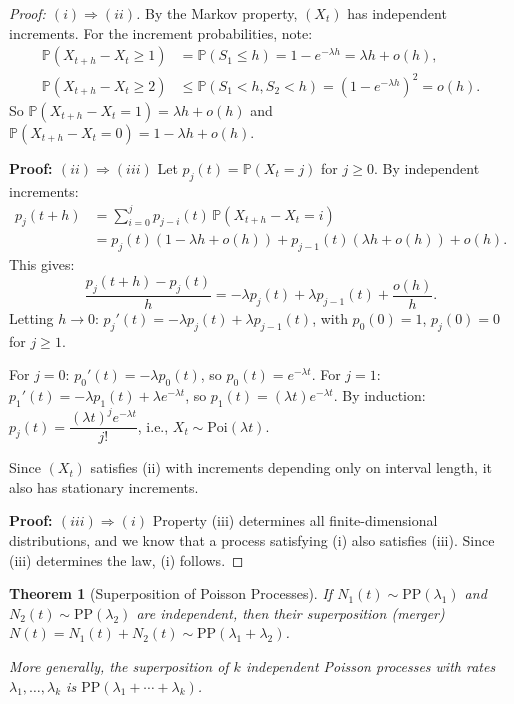\documentclass[12pt, a4paper]{article}
\theoremstyle{definition}
\theoremstyle{plain}
\newtheorem{theorem}{Theorem}[section]
\newcommand{\PP}{\mathbb{P}}
\begin{document}
\begin{proof}[Proof: $(i)\Rightarrow(ii)$]
By the Markov property, $(X_t)$ has independent increments. For the increment probabilities, note:
\begin{align*}
  \PP(X_{t+h}-X_t\ge 1) &= \PP(S_1\le h) = 1-e^{-\lambda h} = \lambda h+o(h),\\
  \PP(X_{t+h}-X_t\ge 2) &\le \PP(S_1<h,S_2<h) = (1-e^{-\lambda h})^2 = o(h).
\end{align*}
So $\PP(X_{t+h}-X_t=1)=\lambda h+o(h)$ and $\PP(X_{t+h}-X_t=0)=1-\lambda h+o(h)$.

\medskip\noindent\textbf{Proof: $(ii)\Rightarrow(iii)$} Let $p_j(t)=\PP(X_t=j)$ for $j\ge 0$. By independent increments:
\begin{align*}
  p_j(t+h) &= \sum_{i=0}^{j} p_{j-i}(t)\,\PP(X_{t+h}-X_t=i)\\
  &= p_j(t)(1-\lambda h+o(h)) + p_{j-1}(t)(\lambda h+o(h)) + o(h).
\end{align*}
This gives:
\[
  \frac{p_j(t+h)-p_j(t)}{h} = -\lambda p_j(t) + \lambda p_{j-1}(t) + \frac{o(h)}{h}.
\]
Letting $h\to 0$: $p_j'(t) = -\lambda p_j(t)+\lambda p_{j-1}(t)$, with $p_0(0)=1$, $p_j(0)=0$ for $j\ge 1$.

For $j=0$: $p_0'(t)=-\lambda p_0(t)$, so $p_0(t)=e^{-\lambda t}$.
For $j=1$: $p_1'(t)=-\lambda p_1(t)+\lambda e^{-\lambda t}$, so $p_1(t)=(\lambda t)e^{-\lambda t}$.
By induction: $p_j(t) = \dfrac{(\lambda t)^j e^{-\lambda t}}{j!}$, i.e., $X_t\sim\text{Poi}(\lambda t)$.

Since $(X_t)$ satisfies (ii) with increments depending only on interval length, it also has stationary increments.

\medskip\noindent\textbf{Proof: $(iii)\Rightarrow(i)$} Property (iii) determines all finite-dimensional distributions, and we know that a process satisfying (i) also satisfies (iii). Since (iii) determines the law, (i) follows.
\end{proof}


\begin{theorem}[Superposition of Poisson Processes]
If $N_1(t) \sim \text{PP}(\lambda_1)$ and $N_2(t) \sim \text{PP}(\lambda_2)$ are independent, then their superposition (merger) $N(t) = N_1(t) + N_2(t) \sim \text{PP}(\lambda_1 + \lambda_2)$.

More generally, the superposition of $k$ independent Poisson processes with rates $\lambda_1, \ldots, \lambda_k$ is $\text{PP}(\lambda_1 + \cdots + \lambda_k)$.
\end{theorem}
\end{document}
